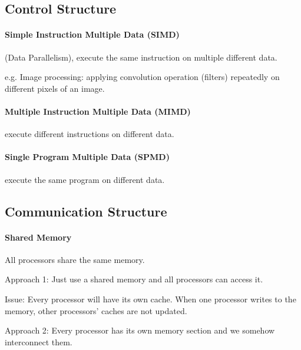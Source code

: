 \documentclass{../../ainote}
\begin{document}
\subsection{Control Structure}

\paragraph{Simple Instruction Multiple Data (SIMD)} (Data Parallelism), execute the same instruction on multiple different data.

e.g. Image processing: applying convolution operation (filters) repeatedly on different pixels of an image. 

\paragraph{Multiple Instruction Multiple Data (MIMD)} execute different instructions on different data.

\paragraph{Single Program Multiple Data (SPMD)} execute the same program on different data.

\subsection{Communication Structure}
\paragraph{Shared Memory} All processors share the same memory.

Approach 1: Just use a shared memory and all processors can access it.

Issue: Every processor will have its own cache. When one processor writes to the memory, other processors' caches are not updated.

Approach 2: Every processor has its own memory section and we somehow interconnect them.
\end{document}
